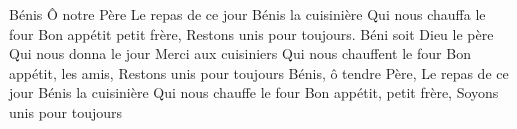 \beginverse
Bénis Ô notre Père
Le repas de ce jour
Bénis la cuisinière
Qui nous chauffa le four
Bon appétit petit frère,
Restons unis pour toujours.
\endverse
\beginverse
Béni soit Dieu le père
Qui nous donna le jour
Merci aux cuisiniers
Qui nous chauffent le four
Bon appétit, les amis,
Restons unis pour toujours
\endverse
\beginverse
Bénis, ô tendre Père,
Le repas de ce jour
Bénis la cuisinière
Qui nous chauffe le four
Bon appétit, petit frère,
Soyons unis pour toujours
\endverse
\endsong
